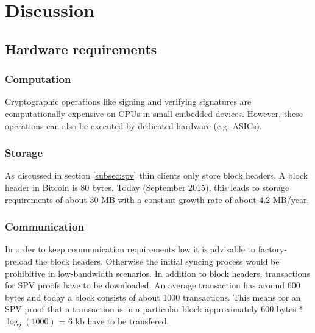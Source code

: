 \documentclass[10pt, conference,compsoc]{IEEEtran}
\begin{document}

\section{Discussion}

\subsection{Hardware requirements}

\subsubsection*{Computation}
Cryptographic operations like signing and verifying signatures are computationally expensive on CPUs in small embedded devices. However, these operations can also be executed by dedicated hardware (e.g. ASICs).  

\subsubsection*{Storage}
As discussed in section \ref{subsec:spv} thin clients only store block headers. A block header in Bitcoin is 80 bytes. Today (September 2015), this leads to storage requirements of about 30 MB with a constant growth rate of about 4.2 MB/year.

\subsubsection*{Communication}
In order to keep communication requirements low it is advisable to factory-preload the block headers. Otherwise the initial syncing process would be prohibitive in low-bandwidth scenarios. In addition to block headers, transactions for SPV proofs have to be downloaded. An average transaction has around 600 bytes and today a block consists of about 1000 transactions. This means for an SPV proof that a transaction is in a particular block approximately 600 bytes * $\log_2(1000)$ = 6 kb have to be transfered.

\end{document}
